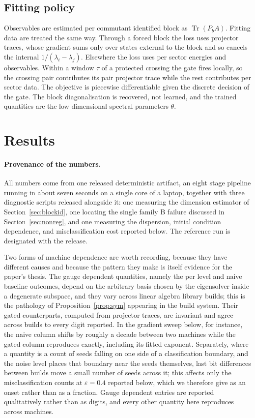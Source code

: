 \documentclass[11pt]{article}
\newcommand{\Tr}{\operatorname{Tr}}
\begin{document}
\subsection{Fitting policy}
Observables are estimated per commutant identified block as $\Tr(P_bA)$. Fitting
data are treated the same way. Through a forced block the loss uses projector
traces, whose gradient sums only over states external to the block and so cancels
the internal $1/(\lambda_i-\lambda_j)$. Elsewhere the loss uses per sector
energies and observables. Within a window $\tau$ of a protected crossing the gate
fires locally, so the crossing pair contributes its pair projector trace while the
rest contributes per sector data. The objective is piecewise differentiable given
the discrete decision of the gate. The block diagonalisation is recovered, not
learned, and the trained quantities are the low dimensional spectral parameters
$\theta$.

\section{Results}\label{sec:results}
\paragraph{Provenance of the numbers.}
All numbers come from one released deterministic artifact, an eight stage pipeline running in about seven seconds on a single core of a laptop, together with three diagnostic scripts released alongside it: one measuring the dimension estimator of Section~\ref{sec:blockid}, one locating the single family B failure discussed in Section~\ref{sec:nonreg}, and one measuring the dispersion, initial condition dependence, and misclassification cost reported below. The reference run is
designated with the release.

Two forms of machine dependence are worth recording, because they have different
causes and because the pattern they make is itself evidence for the paper's
thesis. The gauge dependent quantities, namely the per level and naive baseline
outcomes, depend on the arbitrary basis chosen by the eigensolver inside a
degenerate subspace, and they vary across linear algebra library builds; this is
the pathology of Proposition~\ref{prop:sym} appearing in the build system. Their
gated counterparts, computed from projector traces, are invariant and agree
across builds to every digit reported. In the gradient sweep below, for instance,
the naive column shifts by roughly a decade between two machines while the gated
column reproduces exactly, including its fitted exponent. Separately, where a
quantity is a count of seeds falling on one side of a classification boundary,
and the noise level places that boundary near the seeds themselves, last bit
differences between builds move a small number of seeds across it; this affects
only the misclassification counts at $\varepsilon=0.4$ reported below, which we
therefore give as an onset rather than as a fraction. Gauge dependent entries are
reported qualitatively rather than as digits, and every other quantity here
reproduces across machines.
\end{document}
